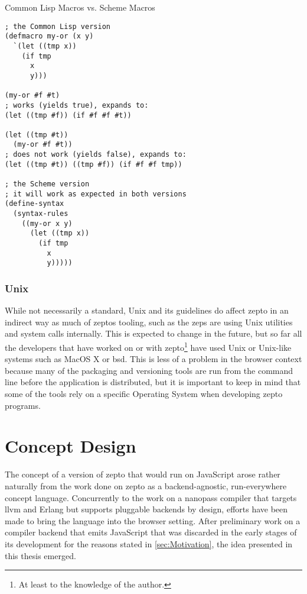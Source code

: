 \documentclass[oneside,11pt,xetex]{scrbook}
\begin{document}
\begin{listing}[H]
\caption{Common Lisp Macros vs. Scheme Macros}
\begin{verbatim}
; the Common Lisp version
(defmacro my-or (x y)
  `(let ((tmp x))
    (if tmp
      x
      y)))

(my-or #f #t)
; works (yields true), expands to:
(let ((tmp #f)) (if #f #f #t))

(let ((tmp #t))
  (my-or #f #t))
; does not work (yields false), expands to:
(let ((tmp #t)) ((tmp #f)) (if #f #f tmp))

; the Scheme version
; it will work as expected in both versions
(define-syntax
  (syntax-rules
    ((my-or x y)
      (let ((tmp x))
        (if tmp
          x
          y)))))
\end{verbatim}
\end{listing}

\subsection{Unix}

While not necessarily a standard, Unix and its guidelines do affect zepto in an indirect way as much of zeptos
tooling, such as the \gls{zeps} are using Unix utilities and system calls internally. This is expected to change
in the future, but so far all the developers that have worked on or with zepto\footnote{At least to the knowledge
of the author.} have used Unix or Unix-like systems such as MacOS X or \gls{bsd}. This is less of a problem in the
browser context because many of the packaging and versioning tools are run from the command line before the application
is distributed, but it is important to keep in mind that some of the tools rely on a specific Operating System when
developing zepto programs.

\chapter{Concept Design}
\label{chap:ConceptDesign}

The concept of a version of zepto that would run on JavaScript arose rather
naturally from the work done on zepto as a backend-agnostic, run-everywhere
concept language. Concurrently to the work on a nanopass compiler that
targets \gls{llvm} and Erlang but supports pluggable backends by design, efforts
have been made to bring the language into the browser setting. After preliminary
work on a compiler backend that emits JavaScript that was discarded in the
early stages of its development for the reasons stated in \ref{sec:Motivation},
the idea presented in this thesis emerged.
\end{document}
